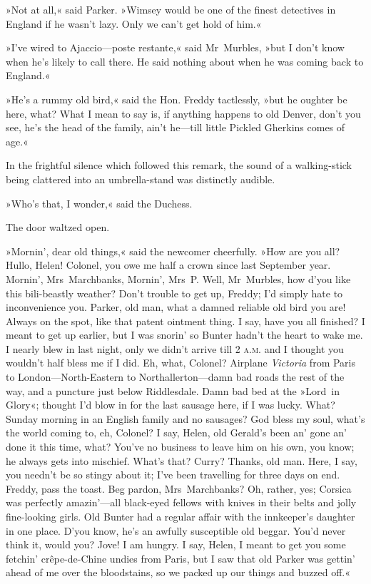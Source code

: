 »Not at all,« said Parker. »Wimsey would be one of the finest detectives in England if he wasn't lazy. Only we can't get hold of him.«

»I've wired to Ajaccio—poste restante,« said Mr~Murbles, »but I don't know when he's likely to call there. He said nothing about when he was coming back to England.«

»He's a rummy old bird,« said the Hon. Freddy tactlessly, »but he oughter be here, what? What I mean to say is, if anything happens to old Denver, don't you see, he's the head of the family, ain't he—till little Pickled Gherkins comes of age.«

In the frightful silence which followed this remark, the sound of a walking-stick being clattered into an umbrella-stand was distinctly
audible.

»Who's that, I wonder,« said the Duchess.

The door waltzed open.

»Mornin', dear old things,« said the newcomer cheerfully. »How are you all? Hullo, Helen! Colonel, you owe me half a crown since last September year. Mornin', Mrs~Marchbanks, Mornin', Mrs~P\@. Well, Mr~Murbles, how d'you like this bili-beastly weather? Don't trouble to get up, Freddy; I'd simply hate to inconvenience you. Parker, old man, what a damned reliable old bird you are! Always on the spot, like that patent ointment thing. I say, have you all finished? I meant to get up earlier, but I was snorin' so Bunter hadn't the heart to wake me. I nearly blew in last night, only we didn't arrive till 2 \textsc{a.m.} and I thought you wouldn't half bless me if I did. Eh, what, Colonel? Airplane \textit{Victoria} from Paris to London—North-Eastern to Northallerton—damn bad roads the rest of the way, and a puncture just below Riddlesdale. Damn bad bed at the »Lord~in Glory«; thought I'd blow in for the last sausage here, if I was lucky. What? Sunday morning in an English family and no sausages? God bless my soul, what's the world coming to, eh, Colonel? I say, Helen, old Gerald's been an' gone an' done it this time, what? You've no business to leave him on his own, you know; he always gets into mischief. What's that? Curry? Thanks, old man. Here, I say, you needn't be so stingy about it; I've been travelling for three days on end. Freddy, pass the toast. Beg pardon, Mrs~Marchbanks? Oh, rather, yes; Corsica was perfectly amazin'—all black-eyed fellows with knives in their belts and jolly fine-looking girls. Old Bunter had a regular affair with the innkeeper's daughter in one place. D'you know, he's an awfully susceptible old beggar. You'd never think it, would you? Jove! I am hungry. I say, Helen, I meant to get you some fetchin' crêpe-de-Chine undies from Paris, but I saw that old Parker was gettin' ahead of me over the bloodstains, so we packed up our things and buzzed off.«

